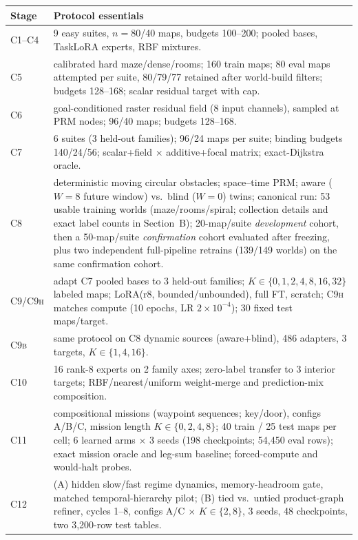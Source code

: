 \documentclass[letterpaper]{article} %
\newcommand{\stage}[1]{\textsc{#1}}
\begin{document}
\begin{table}[t]
\centering
\small
\begin{tabular}{@{}lp{5.9cm}@{}}
\toprule
Stage & Protocol essentials \\
\midrule
\stage{C1--C4} & 9 easy suites, $n{=}80$/40 maps, budgets 100--200; pooled bases, TaskLoRA experts, RBF mixtures. \\
\stage{C5} & calibrated hard maze/dense/rooms; 160 train maps; 80 eval maps attempted per suite, 80/79/77 retained after world-build filters; budgets 128--168; scalar residual target with cap. \\
\stage{C6} & goal-conditioned raster residual field (8 input channels), sampled at PRM nodes; 96/40 maps; budgets 128--168. \\
\stage{C7} & 6 suites (3 held-out families); 96/24 maps per suite; binding budgets 140/24/56; scalar+field $\times$ additive+focal matrix; exact-Dijkstra oracle. \\
\stage{C8} & deterministic moving circular obstacles; space--time PRM; aware ($W{=}8$ future window) vs.\ blind ($W{=}0$) twins; canonical run: 53 usable training worlds (maze/rooms/spiral; collection details and exact label counts in Section~B); 20-map/suite \emph{development} cohort, then a 50-map/suite \emph{confirmation} cohort evaluated after freezing, plus two independent full-pipeline retrains (139/149 worlds) on the same confirmation cohort. \\
\stage{C9/C9h} & adapt \stage{C7} pooled bases to 3 held-out families; $K \in \{0, 1, 2, 4, 8, 16, 32\}$ labeled maps; LoRA(r8, bounded/unbounded), full FT, scratch; \stage{C9h} matches compute (10 epochs, LR $2{\times}10^{-4}$); 30 fixed test maps/target. \\
\stage{C9b} & same protocol on \stage{C8} dynamic sources (aware+blind), 486 adapters, 3 targets, $K\in\{1,4,16\}$. \\
\stage{C10} & 16 rank-8 experts on 2 family axes; zero-label transfer to 3 interior targets; RBF/nearest/uniform weight-merge and prediction-mix composition. \\
\stage{C11} & compositional missions (waypoint sequences; key/door), configs A/B/C, mission length $K\in\{0,2,4,8\}$; 40 train / 25 test maps per cell; 6 learned arms $\times$ 3 seeds (198 checkpoints; 54{,}450 eval rows); exact mission oracle and leg-sum baseline; forced-compute and would-halt probes. \\
\stage{C12} & (A) hidden slow/fast regime dynamics, memory-headroom gate, matched temporal-hierarchy pilot; (B) tied vs.\ untied product-graph refiner, cycles 1--8, configs A/C $\times$ $K\in\{2,8\}$, 3 seeds, 48 checkpoints, two 3{,}200-row test tables. \\

\end{tabular}
\end{table}
\end{document}
